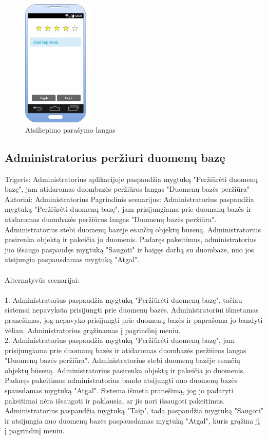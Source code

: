 \documentclass[oneside]{VUMIFPSkursinis}
\begin{document}
\begin{figure}[h]
    \centering
    \includegraphics[width=0.30\textwidth]{GUI13.jpg}
    \caption{Atsiliepimo parašymo langas}
    \label{fig:atsiliepimas}
\end{figure}


\subsection{Administratorius peržiūri duomenų bazę}
	Trigeris: Administratorius aplikacijoje paspaudžia mygtuką "Peržiūrėti duomenų bazę", jam atidaromas duombazės peržiūros langas "Duomenų bazės peržiūra"
	Aktoriai: Administratorius
	Pagrindinis scenarijus: Administratorius paspaudžia mygtuką "Peržiūrėti duomenų bazę", jam prisijungiama prie duomanų bazės ir atidaromas duombazės peržiūros langas "Duomenų bazės peržiūra". Administratorius stebi duomenų bazėje esančių objektų būseną. Administratorius pasirenka objektą ir pakeičia jo duomenis. Padaręs pakeitimus, administratorius juo išsaugo paspaudęs mygtuką "Saugoti" ir baigęs darbą su duombaze, nuo jos atsijungia paspausdamas mygtuką "Atgal". \\ \\
	Alternatyvūs scenarijai:  \\ \\ 
1. Administratorius paspaudžia mygtuką "Peržiūrėti duomenų bazę", tačiau sistemai nepavyksta prisijungti prie duomenų bazės. Administratoriui išmetamas pranešimas, jog nepavyko prisijungti prie duomenų bazės ir paprašoma jo bandyti vėliau. Administratorius grąžinamas į pagrindinį meniu. \\
2. Administratorius paspaudžia mygtuką "Peržiūrėti duomenų bazę", jam prisijungiama prie duomanų bazės ir atidaromas duombazės peržiūros langas "Duomenų bazės peržiūra". Administratorius stebi duomenų bazėje esančių objektų būseną. Administratorius pasirenka objektą ir pakeičia jo duomenis. Padaręs pakeitimus administratorius bando atsijungti nuo duomenų bazės spausdamas mygtuką "Atgal". Sistema išmeta pranešimą, jog jo padaryti pakeitimai nėra išsaugoti ir paklausia, ar jis nori išsaugoti pakeitimus. Administratorius paspaudžia mygtuką "Taip", tada paspaudžia mygtuką "Saugoti" ir atsijungia nuo duomenų bazės paspausdamas mygtuką "Atgal", kuris grąžina jį į pagrindinį meniu. \\ \\
\end{document}
